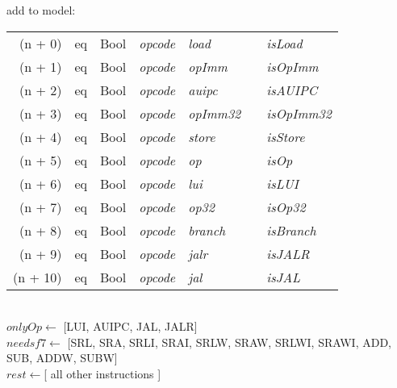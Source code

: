 \begin{algorithm}
    add to model:\\
    \begin{tabular}[h]{>{\ttfamily\color{UniRed}}r >{\ttfamily}l >{\ttfamily\color{UniGrey}}l >{\slshape\color{UniRed}}l >{\slshape\color{UniRed}}l >{\slshape\color{UniRed}}l >{\slshape} l}
        \hline
        \hline
        (n + 0)  & eq & Bool & opcode & load    &  & isLoad    \\
        (n + 1)  & eq & Bool & opcode & opImm   &  & isOpImm   \\
        (n + 2)  & eq & Bool & opcode & auipc   &  & isAUIPC   \\
        (n + 3)  & eq & Bool & opcode & opImm32 &  & isOpImm32 \\
        (n + 4)  & eq & Bool & opcode & store   &  & isStore   \\
        (n + 5)  & eq & Bool & opcode & op      &  & isOp      \\
        (n + 6)  & eq & Bool & opcode & lui     &  & isLUI     \\
        (n + 7)  & eq & Bool & opcode & op32    &  & isOp32    \\
        (n + 8)  & eq & Bool & opcode & branch  &  & isBranch  \\
        (n + 9)  & eq & Bool & opcode & jalr    &  & isJALR    \\
        (n + 10) & eq & Bool & opcode & jal     &  & isJAL     \\
        \hline
        \hline
    \end{tabular}\\
    $onlyOp \leftarrow$ [LUI, AUIPC, JAL, JALR]\\
    $needsf7 \leftarrow$ [SRL, SRA, SRLI, SRAI, SRLW, SRAW, SRLWI, SRAWI, ADD, SUB, ADDW, SUBW]\\
    $rest \leftarrow$[ all other instructions ]\\

\end{algorithm}
